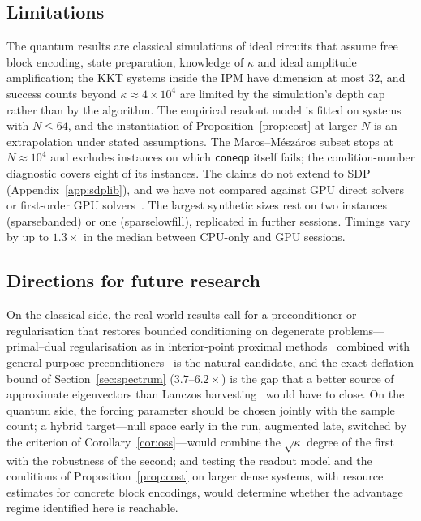 \documentclass[11pt]{article}
\theoremstyle{definition}
\newcommand{\dsus}{\textunderscore\penalty5000\hskip0pt\relax}
\newcommand{\ds}[1]{{\ttfamily\let\_\dsus#1}}
\begin{document}
\subsection{Limitations}
The quantum results are classical simulations of ideal circuits that assume free block encoding, state preparation, knowledge of $\kappa$ and ideal amplitude amplification; the KKT systems inside the IPM have dimension at most 32, and success counts beyond $\kappa\approx4\times10^{4}$ are limited by the simulation's depth cap rather than by the algorithm. The empirical readout model is fitted on systems with $N\le64$, and the instantiation of Proposition~\ref{prop:cost} at larger $N$ is an extrapolation under stated assumptions. The Maros--M\'esz\'aros subset stops at $N\approx10^{4}$ and excludes instances on which \texttt{coneqp} itself fails; the condition-number diagnostic covers eight of its instances. The claims do not extend to SDP (Appendix~\ref{app:sdplib}), and we have not compared against GPU direct solvers~\cite{chen2025cuclarabel} or first-order GPU solvers~\cite{lu2025cupdlp}. The largest synthetic sizes rest on two instances (\ds{sparse\_banded}) or one (\ds{sparse\_lowfill}), replicated in further sessions. Timings vary by up to $1.3\times$ in the median between CPU-only and GPU sessions.

\subsection{Directions for future research}
On the classical side, the real-world results call for a preconditioner or regularisation that restores bounded conditioning on degenerate problems---primal--dual regularisation as in interior-point proximal methods~\cite{pougkakiotis2021ippmm} combined with general-purpose preconditioners~\cite{gondzio2022generalpurpose,bergamaschi2004preconditioning} is the natural candidate, and the exact-deflation bound of Section~\ref{sec:spectrum} ($3.7$--$6.2\times$) is the gap that a better source of approximate eigenvectors than Lanczos harvesting~\cite{luo2024neurkitt} would have to close. On the quantum side, the forcing parameter should be chosen jointly with the sample count; a hybrid target---null space early in the run, augmented late, switched by the criterion of Corollary~\ref{cor:oss}---would combine the $\sqrt{\kappa}$ degree of the first with the robustness of the second; and testing the readout model and the conditions of Proposition~\ref{prop:cost} on larger dense systems, with resource estimates for concrete block encodings, would determine whether the advantage regime identified here is reachable.
\end{document}
